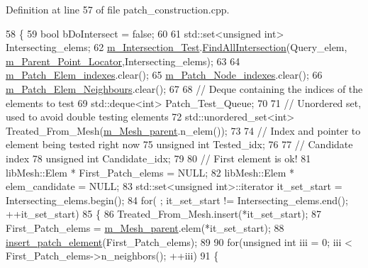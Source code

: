 Definition at line 57 of file patch\+\_\+construction.\+cpp.


\begin{DoxyCode}
58 \{
59     \textcolor{keywordtype}{bool} bDoIntersect = \textcolor{keyword}{false};
60 
61     std::set<unsigned int> Intersecting\_elems;
62     \hyperlink{classcarl_1_1_patch__construction_a59f947d3d18761b1ad1a5913eb59ca83}{m\_Intersection\_Test}.\hyperlink{classcarl_1_1_intersection___tools_a8238069bd83ef1029c6a5b60a188763b}{FindAllIntersection}(Query\_elem,
      \hyperlink{classcarl_1_1_patch__construction_a382e1ea46006b1ea6445af758e157ceb}{m\_Parent\_Point\_Locator},Intersecting\_elems);
63 
64     \hyperlink{classcarl_1_1_patch__construction_af7db498027d46bff8464757e824404fb}{m\_Patch\_Elem\_indexes}.clear();
65     \hyperlink{classcarl_1_1_patch__construction_a85fb959e6f57d935a8d6fe0d4f0f7f46}{m\_Patch\_Node\_indexes}.clear();
66     \hyperlink{classcarl_1_1_patch__construction_a47c4343835537781c48813feed01e60e}{m\_Patch\_Elem\_Neighbours}.clear();
67 
68     \textcolor{comment}{// Deque containing the indices of the elements to test}
69     std::deque<int> Patch\_Test\_Queue;
70 
71     \textcolor{comment}{// Unordered set, used to avoid double testing elements}
72     std::unordered\_set<int> Treated\_From\_Mesh(\hyperlink{classcarl_1_1_patch__construction_aec2f60b62d5d7b44bfcc4f9ca9de28d2}{m\_Mesh\_parent}.n\_elem());
73 
74     \textcolor{comment}{// Index and pointer to element being tested right now}
75     \textcolor{keywordtype}{unsigned} \textcolor{keywordtype}{int}    Tested\_idx;
76 
77     \textcolor{comment}{// Candidate index}
78     \textcolor{keywordtype}{unsigned} \textcolor{keywordtype}{int}    Candidate\_idx;
79 
80     \textcolor{comment}{// First element is ok!}
81     libMesh::Elem *     First\_Patch\_elems = NULL;
82     libMesh::Elem *     elem\_candidate = NULL;
83     std::set<unsigned int>::iterator it\_set\_start = Intersecting\_elems.begin();
84     \textcolor{keywordflow}{for}( ; it\_set\_start != Intersecting\_elems.end(); ++it\_set\_start)
85     \{
86         Treated\_From\_Mesh.insert(*it\_set\_start);
87         First\_Patch\_elems = \hyperlink{classcarl_1_1_patch__construction_aec2f60b62d5d7b44bfcc4f9ca9de28d2}{m\_Mesh\_parent}.elem(*it\_set\_start);
88         \hyperlink{classcarl_1_1_patch__construction_ae7a46ef950445a82cb0036b49b778fbf}{insert\_patch\_element}(First\_Patch\_elems);
89 
90         \textcolor{keywordflow}{for}(\textcolor{keywordtype}{unsigned} \textcolor{keywordtype}{int} iii = 0; iii < First\_Patch\_elems->n\_neighbors(); ++iii)
91         \{

\end{DoxyCode}
